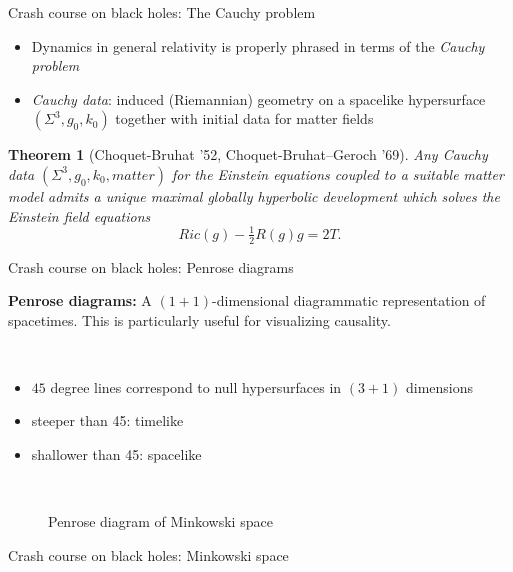 \documentclass[compress,usenames,dvipsnames,8pt]{beamer}
\newtheorem*{thm}{Theorem}
\theoremstyle{definition}
\renewcommand{\(}{\begin{columns}}
\renewcommand{\)}{\end{columns}}
\newcommand{\<}[1]{\begin{column}{#1}}
\renewcommand{\>}{\end{column}}
\begin{document}
\begin{frame}{Crash course on black holes: The Cauchy problem}

\begin{itemize}

\item Dynamics in general relativity is properly phrased in terms of the \emph{Cauchy problem}
\item \emph{Cauchy data}: induced (Riemannian) geometry on a spacelike hypersurface $(\Sigma^3,g_0,k_0)$ together with initial data for matter fields \pause
\end{itemize}

\begin{thm}[Choquet-Bruhat '52, Choquet-Bruhat--Geroch '69]
Any Cauchy data $(\Sigma^3,g_0,k_0,matter)$ for the Einstein equations coupled to a suitable matter model admits a unique maximal globally hyperbolic development which solves the Einstein field equations
\[Ric(g)-\tfrac 12 R(g)g = 2T.\]
\end{thm}
 

\end{frame}



\begin{frame}{Crash course on black holes: Penrose diagrams}

\textbf{Penrose diagrams:} A $(1+1)$-dimensional diagrammatic representation of spacetimes. This is particularly useful for visualizing causality. \pause

~\\ 

\begin{itemize}
\item $45$ degree lines correspond to null hypersurfaces in $(3+1)$ dimensions
\item steeper than 45: timelike
\item shallower than 45: spacelike
\end{itemize}



~\\

\begin{figure}
 \def\svgwidth{8pc}

\caption{Penrose diagram of Minkowski space}
\end{figure}

\end{frame}



\begin{frame}{Crash course on black holes: Minkowski space}

\begin{figure}
 \def\svgwidth{9pc}

\end{figure}

\end{frame}
\end{document}
